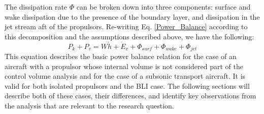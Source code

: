 				\indent The dissipation rate $\Phi$ can be broken down into three components:  surface and wake dissipation due to the presence of the boundary layer, and dissipation in the jet stream aft of the propulsors.  Re-writing Eq. \ref{Power_Balance} according to this decomposition and the assumptions described above, we have the following:
				\begin{equation}
					P_k + P_v = W\dot{h}+\dot{E}_v + \Phi_{surf} + \Phi_{wake} + \Phi_{jet} 
					\label{Power_Balance_Rewrite}
				\end{equation}%
				This equation describes the basic power balance relation for the case of an aircraft with a propulsor whose internal volume is not considered part of the control volume analysis and for the case of a subsonic transport aircraft.  It is valid for both isolated propulsors and the BLI case.  The following sections will describe both of these cases, their differences, and identify key observations from the analysis that are relevant to the research question.
	
